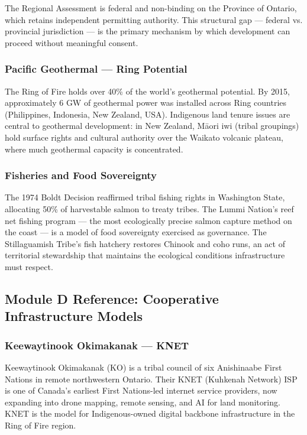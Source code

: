 \documentclass[11pt,letterpaper]{article}
\begin{document}
The Regional Assessment is federal and non-binding on the Province of Ontario, which retains independent permitting authority. This structural gap --- federal vs. provincial jurisdiction --- is the primary mechanism by which development can proceed without meaningful consent.

\subsubsection{Pacific Geothermal --- Ring Potential}

The Ring of Fire holds over 40\% of the world's geothermal potential. By 2015, approximately 6 GW of geothermal power was installed across Ring countries (Philippines, Indonesia, New Zealand, USA). Indigenous land tenure issues are central to geothermal development: in New Zealand, Māori iwi (tribal groupings) hold surface rights and cultural authority over the Waikato volcanic plateau, where much geothermal capacity is concentrated.

\subsubsection{Fisheries and Food Sovereignty}

The 1974 Boldt Decision reaffirmed tribal fishing rights in Washington State, allocating 50\% of harvestable salmon to treaty tribes. The Lummi Nation's reef net fishing program --- the most ecologically precise salmon capture method on the coast --- is a model of food sovereignty exercised as governance. The Stillaguamish Tribe's fish hatchery restores Chinook and coho runs, an act of territorial stewardship that maintains the ecological conditions infrastructure must respect.

\subsection{Module D Reference: Cooperative Infrastructure Models}

\subsubsection{Keewaytinook Okimakanak --- KNET}

Keewaytinook Okimakanak (KO) is a tribal council of six Anishinaabe First Nations in remote northwestern Ontario. Their KNET (Kuhkenah Network) ISP is one of Canada's earliest First Nations-led internet service providers, now expanding into drone mapping, remote sensing, and AI for land monitoring. KNET is the model for Indigenous-owned digital backbone infrastructure in the Ring of Fire region.
\end{document}
